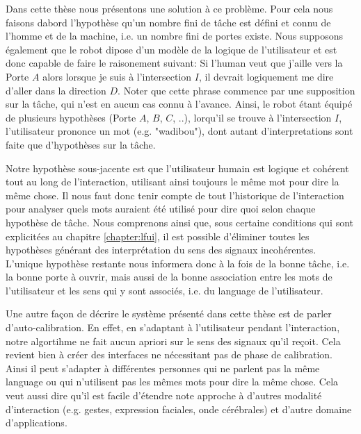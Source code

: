 Dans cette thèse nous présentons une solution à ce problème. Pour cela nous faisons dabord l'hypothèse qu'un nombre fini de tâche est défini et connu de l'homme et de la machine, i.e. un nombre fini de portes existe. Nous supposons également que le robot dipose d'un modèle de la logique de l'utilisateur et est donc capable de faire le raisonement suivant: Si l'human veut que j'aille vers la Porte $A$ alors lorsque je suis à l'intersection $I$, il devrait logiquement me dire d'aller dans la direction $D$. Noter que cette phrase commence par une supposition sur la tâche, qui n'est en aucun cas connu à l'avance. Ainsi, le robot étant équipé de plusieurs hypothèses (Porte $A$, $B$, $C$, ..), lorqu'il se trouve à l'intersection $I$, l'utilisateur prononce un mot (e.g. "wadibou"), dont autant d'interpretations sont faite que d'hypothèses sur la tâche.

Notre hypothèse sous-jacente est que l'utilisateur humain est logique et cohérent tout au long de l'interaction, utilisant ainsi toujours le même mot pour dire la même chose. Il nous faut donc tenir compte de tout l'historique de l'interaction pour analyser quels mots auraient été utilisé pour dire quoi selon chaque hypothèse de tâche. Nous comprenons ainsi que, sous certaine conditions qui sont explicitées au chapitre \ref{chapter:lfui}, il est possible d'éliminer toutes les hypothèses générant des interprétation du sens des signaux incohérentes. L'unique hypothèse restante nous informera donc à la fois de la bonne tâche, i.e. la bonne porte à ouvrir, mais aussi de la bonne association entre les mots de l'utilisateur et les sens qui y sont associés, i.e. du language de l'utilisateur.

Une autre façon de décrire le système présenté dans cette thèse est de parler d'auto-calibration. En effet, en s'adaptant à l'utilisateur pendant l'interaction, notre algortihme ne fait aucun apriori sur le sens des signaux qu'il reçoit. Cela revient bien à créer des interfaces ne nécessitant pas de phase de calibration. Ainsi il peut s'adapter à différentes personnes qui ne parlent pas la même language ou qui n'utilisent pas les mêmes mots pour dire la même chose. Cela veut aussi dire qu'il est facile d'étendre note approche à d'autres modalité d'interaction (e.g. gestes, expression faciales, onde cérébrales) et d'autre domaine d'applications.



